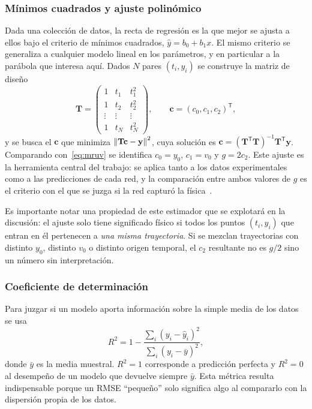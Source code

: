 \documentclass[titlepage,11pt]{article}
\begin{document}
\subsubsection{Mínimos cuadrados y ajuste polinómico}
\label{subsubsec:minimoscuadrados}
Dada una colección de datos, la recta de regresión es la que mejor se ajusta a
ellos bajo el criterio de mínimos cuadrados, $\hat y = b_0+b_1x$. El mismo
criterio se generaliza a cualquier modelo lineal en los parámetros, y en
particular a la parábola que interesa aquí. Dados $N$ pares $(t_i,y_i)$ se
construye la matriz de diseño
\begin{equation}
  \mathbf{T} =
  \begin{pmatrix}
    1 & t_1 & t_1^2\\
    1 & t_2 & t_2^2\\
    \vdots & \vdots & \vdots\\
    1 & t_N & t_N^2
  \end{pmatrix},
  \qquad
  \mathbf{c} = (c_0,c_1,c_2)^{\mathsf T},
\end{equation}
y se busca el $\mathbf{c}$ que minimiza $\norm{\mathbf{T}\mathbf{c}-\mathbf{y}}^2$,
cuya solución es $\mathbf{c}=(\mathbf{T}^{\mathsf T}\mathbf{T})^{-1}\mathbf{T}^{\mathsf T}\mathbf{y}$.
Comparando con~\eqref{eq:mruv} se identifica $c_0=y_0$, $c_1=v_0$ y
$g=2c_2$. Este ajuste es la herramienta central del trabajo: se aplica tanto a
los datos experimentales como a las predicciones de cada red, y la comparación
entre ambos valores de $g$ es el criterio con el que se juzga si la red capturó
la física~\cite{triola_2018_estadstica}.

Es importante notar una propiedad de este estimador que se explotará en la
discusión: el ajuste solo tiene significado físico si todos los puntos
$(t_i,y_i)$ que entran en él pertenecen a \emph{una misma trayectoria}. Si se
mezclan trayectorias con distinto $y_0$, distinto $v_0$ o distinto origen
temporal, el $c_2$ resultante no es $g/2$ sino un número sin interpretación.

\subsubsection{Coeficiente de determinación}
Para juzgar si un modelo aporta información sobre la simple media de los datos
se usa
\begin{equation}
  R^2 = 1 - \frac{\sum_i (y_i-\hat y_i)^2}{\sum_i (y_i-\bar y)^2},
  \label{eq:r2}
\end{equation}
donde $\bar y$ es la media muestral. $R^2=1$ corresponde a predicción perfecta
y $R^2=0$ al desempeño de un modelo que devuelve siempre $\bar y$. Esta métrica
resulta indispensable porque un RMSE \enquote{pequeño} solo significa algo al
compararlo con la dispersión propia de los datos.
\end{document}
